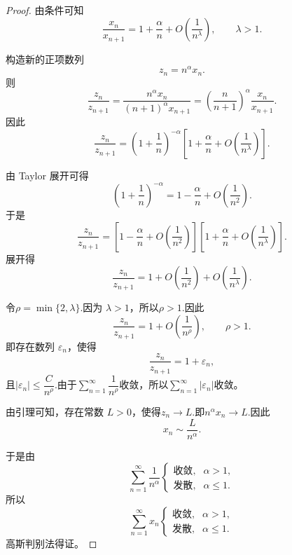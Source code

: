 \begin{proof}
	由条件可知
\[
\frac{x_n}{x_{n+1}}
=
1+\frac{\alpha}{n}+O\left(\frac{1}{n^\lambda}\right),
\qquad \lambda>1.
\]

构造新的正项数列
\[
z_n=n^\alpha x_n.
\]
则
\[
\frac{z_n}{z_{n+1}}
=
\frac{n^\alpha x_n}{(n+1)^\alpha x_{n+1}}
=
\left(\frac{n}{n+1}\right)^\alpha
\frac{x_n}{x_{n+1}}.
\]
因此
\[
\frac{z_n}{z_{n+1}}
=
\left(1+\frac{1}{n}\right)^{-\alpha}
\left[
1+\frac{\alpha}{n}
+
O\left(\frac{1}{n^\lambda}\right)
\right].
\]

由 Taylor 展开可得
\[
\left(1+\frac{1}{n}\right)^{-\alpha}
=
1-\frac{\alpha}{n}
+
O\left(\frac{1}{n^2}\right).
\]
于是
\[
\frac{z_n}{z_{n+1}}
=
\left[
1-\frac{\alpha}{n}
+
O\left(\frac{1}{n^2}\right)
\right]
\left[
1+\frac{\alpha}{n}
+
O\left(\frac{1}{n^\lambda}\right)
\right].
\]
展开得
\[
\frac{z_n}{z_{n+1}}
=
1
+
O\left(\frac{1}{n^2}\right)
+
O\left(\frac{1}{n^\lambda}\right).
\]

令$\rho=\min\{2,\lambda\}.$因为 $\lambda>1$，所以$\rho>1.$因此
\[
\frac{z_n}{z_{n+1}}
=
1+O\left(\frac{1}{n^\rho}\right),
\qquad \rho>1.
\]
即存在数列 $\varepsilon_n$，使得
\[
\frac{z_n}{z_{n+1}}=1+\varepsilon_n,
\]
且$|\varepsilon_n|\leq \dfrac{C}{n^\rho}.$由于$\sum\limits_{n=1}^{\infty}\dfrac{1}{n^\rho}$收敛，所以$\sum\limits_{n=1}^{\infty}|\varepsilon_n|$收敛。

由引理可知，存在常数 $L>0$，使得$z_n\to L.$即$n^\alpha x_n\to L.$因此
\[
x_n\sim \frac{L}{n^\alpha}.
\]

于是由
\[
\sum_{n=1}^{\infty}\frac{1}{n^\alpha}
\begin{cases}
	\text{收敛}, & \alpha>1,\\
	\text{发散}, & \alpha\leq 1.
\end{cases}
\]
所以
\[
\sum_{n=1}^{\infty}x_n
\begin{cases}
	\text{收敛}, & \alpha>1,\\
	\text{发散}, & \alpha\leq 1.
\end{cases}
\]
高斯判别法得证。
\end{proof}





